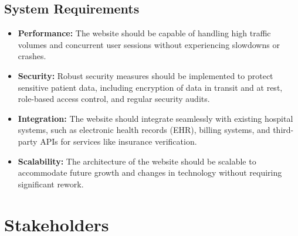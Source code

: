 \documentclass{article}
\begin{document}
\subsection{System Requirements}
\begin{itemize}
    \item \textbf{Performance:} The website should be capable of handling high traffic volumes and concurrent user sessions without experiencing slowdowns or crashes.
    \item \textbf{Security:} Robust security measures should be implemented to protect sensitive patient data, including encryption of data in transit and at rest, role-based access control, and regular security audits.
    \item \textbf{Integration:} The website should integrate seamlessly with existing hospital systems, such as electronic health records (EHR), billing systems, and third-party APIs for services like insurance verification.
    \item \textbf{Scalability:} The architecture of the website should be scalable to accommodate future growth and changes in technology without requiring significant rework.
\end{itemize}


\clearpage

\section{Stakeholders} \label{sec:stakeholders}
\end{document}
